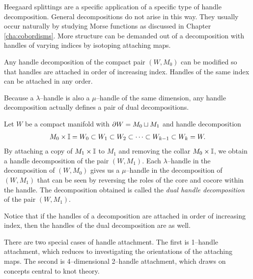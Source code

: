 Heegaard splittings are a specific application of a specific type of handle decomposition.
General decompositions do not arise in this way.
They usually occur naturally by studying Morse functions as discussed in Chapter \ref{cha:cobordisms}.
More structure can be demanded out of a decomposition with handles of varying indices by isotoping attaching maps.

\begin{prop}
	\label{prop:incrindex}
	Any handle decomposition of the compact pair $(W,M_0)$ can be modified so that handles are attached in order of increasing index.
	Handles of the same index can be attached in any order.	
\end{prop}

Because a $\lambda$--handle is also a $\mu$--handle of the same dimension, any handle decomposition actually defines a pair of dual decompositions.

\begin{defn}
	Let $W$ be a compact manifold with $\partial W = M_0 \sqcup M_1$ and handle decomposition
	\[
	M_0\times\mathbb{I} = W_0 \subset W_1 \subset W_2 \subset \cdots \subset W_{k-1} \subset W_k = W.
	\]
	By attaching a copy of $M_1 \times\mathbb{I}$ to $M_1$ and removing the collar $M_0\times\mathbb{I}$, we obtain a handle decomposition of the pair $(W,M_1)$.
	Each $\lambda$--handle in the decomposition of $(W,M_0)$ gives us a $\mu$--handle in the decomposition of $(W,M_1)$ that can be seen by reversing the roles of the core and cocore within the handle.
	The decomposition obtained is called the \emph{dual handle decomposition} of the pair $(W,M_1)$.
\end{defn}

Notice that if the handles of a decomposition are attached in order of increasing index, then the handles of the dual decomposition are as well.

There are two special cases of handle attachment.
The first is 1--handle attachment, which reduces to investigating the orientations of the attaching maps.
The second is 4--dimensional 2--handle attachment, which draws on concepts central to knot theory.

